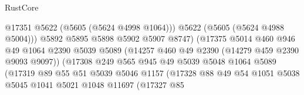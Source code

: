 \begin{lexlean}{RustCore}
\begin{coremodule}
                                              @17351
                                              @5622
                                              (@5605 (@5624 @4998 @1064)))
                                            @5622
                                            (@5605 (@5624 @4988 @5004)))
                                          @5892
                                          @5895
                                          @5898
                                          @5902
                                          @5907
                                          @8747)
                                        (@17375
                                          @5014
                                          @460
                                          @946
                                          @49
                                          @1064
                                          @2390
                                          @5039
                                          @5089
                                          (@14257 @460 @49 @2390 (@14279 @459 @2390 @9093 @9097))
                                          (@17308
                                            @249
                                            @565
                                            @945
                                            @49
                                            @5039
                                            @5048
                                            @1064
                                            @5089
                                            (@17319
                                              @89
                                              @55
                                              @51
                                              @5039
                                              @5046
                                              @1157
                                              (@17328
                                                @88
                                                @49
                                                @54
                                                @1051
                                                @5038
                                                @5045
                                                @1041
                                                @5021
                                                @1048
                                                @11697
                                                (@17327
                                                  @85

\end{coremodule}
\end{lexlean}
